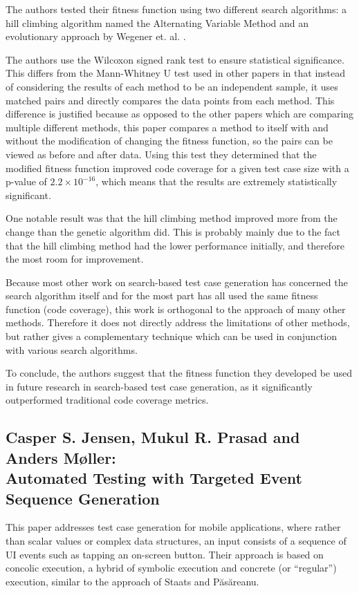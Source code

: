 \documentclass{sig-alternate-05-2015}
\begin{document}
The authors tested their fitness function using two different search
algorithms: a hill climbing algorithm named the Alternating Variable Method
\cite{korel} and an evolutionary approach by Wegener et. al. \cite{wegener}.

The authors use the Wilcoxon signed rank test to ensure statistical
significance. This differs from the Mann-Whitney U test used in other papers
in that instead of considering the results of each method to be an independent
sample, it uses matched pairs and directly compares the data points from each
method. This difference is justified because as opposed to the other papers
which are comparing multiple different methods, this paper compares a method to
itself with and without the modification of changing the fitness function, so
the pairs can be viewed as before and after data. Using this test they
determined that the modified fitness function improved code coverage for a
given test case size with a p-value of $2.2 \times 10^{-16}$, which means that
the results are extremely statistically significant.

One notable result was that the hill climbing method improved more from the
change than the genetic algorithm did. This is probably mainly due to the fact
that the hill climbing method had the lower performance initially, and
therefore the most room for improvement.

Because most other work on search-based test case generation has concerned the
search algorithm itself and for the most part has all used the same fitness
function (code coverage), this work is orthogonal to the approach of many other
methods. Therefore it does not directly address the limitations of other
methods, but rather gives a complementary technique which can be used in
conjunction with various search algorithms.

To conclude, the authors suggest that the fitness function they developed be
used in future research in search-based test case generation, as it
significantly outperformed traditional code coverage metrics.

\subsection{Casper S. Jensen, Mukul R. Prasad and Anders M\o ller: \\Automated
            Testing with Targeted Event Sequence Generation}

This paper \cite{jensen} addresses test case generation for mobile
applications, where rather
than scalar values or complex data structures, an input consists of a sequence
of UI events such as tapping an on-screen button. Their approach is based on
concolic execution, a hybrid of symbolic execution and concrete (or
``regular'') execution, similar to the approach of Staats and
P\u{a}s\u{a}reanu.
\end{document}
